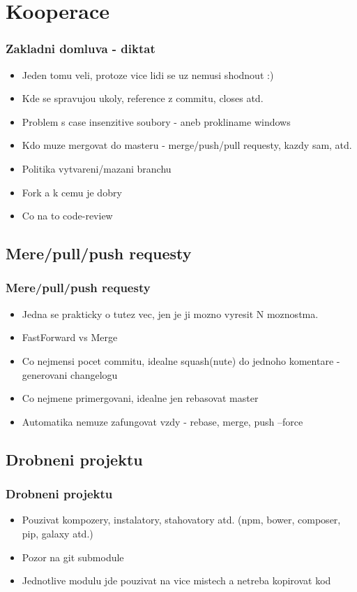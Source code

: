 \documentclass{beamer}
\begin{document}
\section{Kooperace}
\begin{frame}
 \frametitle{Zakladni domluva - diktat}
 \begin{itemize}
  \item Jeden tomu veli, protoze vice lidi se uz nemusi shodnout :)
  \item Kde se spravujou ukoly, reference z commitu, closes atd.
  \item Problem s case insenzitive soubory - aneb prokliname windows
  \item Kdo muze mergovat do masteru - merge/push/pull requesty, kazdy sam, atd.
  \item Politika vytvareni/mazani branchu
  \item Fork a k cemu je dobry
  \item Co na to code-review
 \end{itemize}
\end{frame}

\subsection{Mere/pull/push requesty}
\begin{frame}
 \frametitle{Mere/pull/push requesty}
 \begin{itemize}
  \item Jedna se prakticky o tutez vec, jen je ji mozno vyresit N moznostma.
  \item FastForward vs Merge
  \item Co nejmensi pocet commitu, idealne squash(nute) do jednoho komentare - generovani changelogu
  \item Co nejmene primergovani, idealne jen rebasovat master
  \item Automatika nemuze zafungovat vzdy - rebase, merge, push --force
 \end{itemize}
\end{frame}

\subsection{Drobneni projektu}
\begin{frame}
 \frametitle{Drobneni projektu}
 \begin{itemize}
  \item Pouzivat kompozery, instalatory, stahovatory atd. (npm, bower, composer, pip, galaxy atd.)
  \item Pozor na git submodule
  \item Jednotlive modulu jde pouzivat na vice mistech a netreba kopirovat kod
 \end{itemize}
\end{frame}
\end{document}
